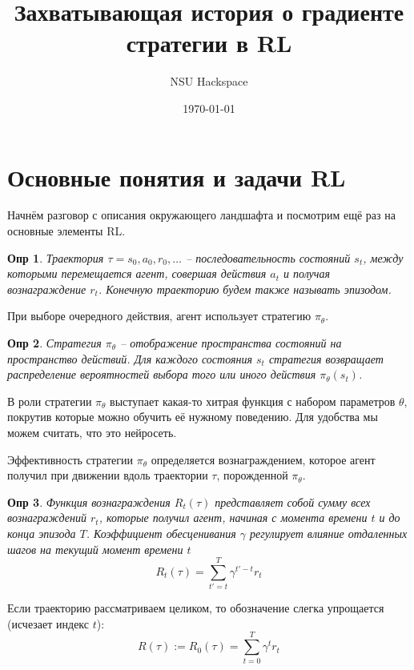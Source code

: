 \documentclass[a4paper,12pt]{article}
\author{NSU Hackspace}
\title{Захватывающая история о градиенте стратегии в RL}
\date{\today}
\newtheorem*{definition}{Опр}
\numberwithin{equation}{section}
\begin{document}

\maketitle

\section{Основные понятия и задачи RL}

Начнём разговор с описания окружающего ландшафта и посмотрим ещё раз на основные элементы RL.

\begin{definition}
	Траектория $\tau = s_0, a_0, r_0, \ldots$ -- последовательность состояний $s_t$, между которыми перемещается агент, совершая действия $a_t$ и получая вознаграждение $r_t$. Конечную траекторию будем также  называть эпизодом.
\end{definition}

При выборе очередного действия, агент использует стратегию $\pi_{\theta}$.

\begin{definition}
	 Стратегия $\pi_{\theta}$ -- отображение пространства состояний на пространство действий. Для каждого состояния $s_t$ стратегия возвращает распределение вероятностей выбора того или иного действия $\pi_{\theta} (s_t)$.
\end{definition}

В роли стратегии $\pi_{\theta}$ выступает какая-то хитрая функция с набором параметров $\theta$, покрутив которые можно обучить её нужному поведению. Для удобства мы можем считать, что это нейросеть. 

Эффективность стратегии $\pi_{\theta}$ определяется вознаграждением, которое агент получил при движении вдоль траектории $\tau$, порожденной $\pi_{\theta}$. 

\begin{definition}
Функция вознаграждения $R_t(\tau)$ представляет собой сумму всех вознаграждений $r_t$, которые получил агент, начиная с момента времени $t$ и до конца эпизода $T$. Коэффициент обесценивания $\gamma$ регулирует влияние отдаленных шагов на текущий момент времени $t$
\[
	R_t(\tau) = \sum_{t' = t}^{T} \gamma^{t' - t} r_t
\]
\end{definition}

Если траекторию рассматриваем целиком, то обозначение слегка упрощается (исчезает индекс $t$):
\[
	R(\tau) := R_0(\tau) = \sum_{t = 0}^{T} \gamma^{t} r_t
\]
\end{document}
